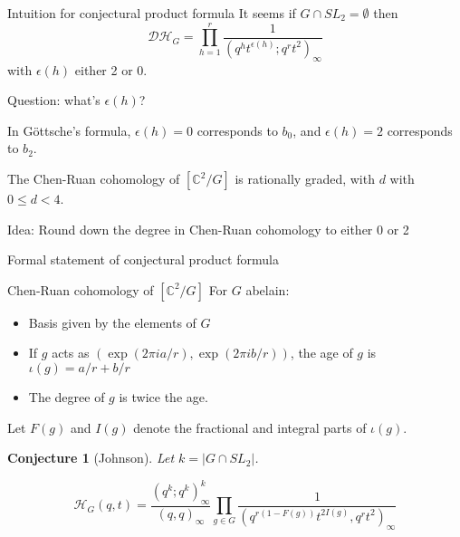 \documentclass{beamer}
\newcommand{\C}{\mathbb{C}}
\newtheorem{conjecture}{Conjecture}
\begin{document}
\begin{frame}{Intuition for conjectural product formula}
 It seems if $G\cap SL_2=\emptyset$ then
$$\mathcal{DH}_{G}=\prod_{h=1}^r \frac{1}{(q^h t^{\epsilon(h)}; q^r t^2)_\infty}$$
with $\epsilon(h)$ either 2 or 0. 

\begin{block}{Question: what's $\epsilon(h)$?}\end{block}

In G\"ottsche's formula, $\epsilon(h)=0$ corresponds to $b_0$, and $\epsilon(h)=2$ corresponds to $b_2$.

The Chen-Ruan cohomology of $[\C^2/G]$ is rationally graded, with $d$ with $0\leq d < 4$.

\begin{block}{Idea: Round down the degree in Chen-Ruan cohomology to either 0 or 2}
\end{block}







\end{frame}


\begin{frame}{Formal statement of conjectural product formula}

\begin{block}{ Chen-Ruan cohomology of $[\C^2/G]$ }
For $G$ abelain:
\begin{itemize}
\item Basis given by the elements of $G$
\item If $g$ acts as $(\exp(2\pi i a/r),\exp(2\pi i b/r))$, the \alert{age} of $g$ is $\iota(g)=a/r+b/r$
\item The degree of $g$ is twice the age.
\end{itemize}
\end{block}
Let $F(g)$ and $I(g)$ denote the fractional and integral parts of $\iota(g)$. 

\begin{conjecture}[Johnson]
Let $k=|G\cap SL_2|$.

$$\mathcal{H}_G(q,t)= \frac{(q^k;q^k)^k_\infty}{(q,q)_\infty} \prod_{g\in G}\frac{1}{(q^{r(1-F(g))} t^{2I(g)},q^rt^2)_\infty}$$

\end{conjecture}

\end{frame}
\end{document}
